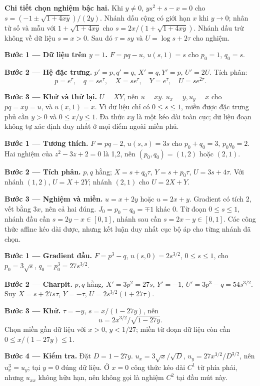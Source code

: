 \textbf{Chi tiết chọn nghiệm bậc hai.} Khi $y\ne0$, $ys^2+s-x=0$ cho $s=(-1\pm\sqrt{1+4xy})/(2y)$. Nhánh dấu cộng có giới hạn $x$ khi $y\to0$; nhân tử số và mẫu với $1+\sqrt{1+4xy}$ cho $s=2x/(1+\sqrt{1+4xy})$. Nhánh dấu trừ không về dữ liệu $s=x>0$. Sau đó $\tau=sy$ và $U=\log s+2\tau$ cho nghiệm.

\textbf{Bước 1 — Dữ liệu trên $y=1$.} $F=pq-u$, $u(s,1)=s$ cho $p_0=1$, $q_0=s$.

\textbf{Bước 2 — Hệ đặc trưng.} $p'=p,q'=q$, $X'=q,Y'=p$, $U'=2U$. Tích phân:
\[p=e^\tau,\quad q=se^\tau,\quad X=se^\tau,\quad Y=e^\tau,\quad U=se^{2\tau}.\]

\textbf{Bước 3 — Khử và thử lại.} $U=XY$, nên $u=xy$. $u_x=y,u_y=x$ cho $pq=xy=u$, và $u(x,1)=x$. Vì dữ liệu chỉ có $0\le s\le1$, miền được đặc trưng phủ cần $y>0$ và $0\le x/y\le1$. Đa thức $xy$ là một kéo dài toàn cục; dữ liệu đoạn không tự xác định duy nhất ở mọi điểm ngoài miền phủ.

\textbf{Bước 1 — Tương thích.} $F=pq-2$, $u(s,s)=3s$ cho $p_0+q_0=3$, $p_0q_0=2$. Hai nghiệm của $z^2-3z+2=0$ là 1,2, nên $(p_0,q_0)=(1,2)$ hoặc $(2,1)$.

\textbf{Bước 2 — Tích phân.} $p,q$ hằng; $X=s+q_0\tau$, $Y=s+p_0\tau$, $U=3s+4\tau$. Với nhánh $(1,2)$, $U=X+2Y$; nhánh $(2,1)$ cho $U=2X+Y$.

\textbf{Bước 3 — Nghiệm và miền.} $u=x+2y$ hoặc $u=2x+y$. Gradient có tích 2, vết bằng $3x$, nên cả hai đúng. $J_0=p_0-q_0=\mp1$ khác 0. Từ đoạn $0\le s\le1$, nhánh đầu cần $s=2y-x\in[0,1]$, nhánh sau cần $s=2x-y\in[0,1]$. Các công thức affine kéo dài được, nhưng kết luận duy nhất cục bộ áp cho từng nhánh đã chọn.

\textbf{Bước 1 — Gradient đầu.} $F=p^3-q$, $u(s,0)=2s^{3/2}$, $0\le s\le1$, cho $p_0=3\sqrt s$, $q_0=p_0^3=27s^{3/2}$.

\textbf{Bước 2 — Charpit.} $p,q$ hằng, $X'=3p^2=27s$, $Y'=-1$, $U'=3p^3-q=54s^{3/2}$. Suy $X=s+27s\tau$, $Y=-\tau$, $U=2s^{3/2}(1+27\tau)$.

\textbf{Bước 3 — Khử.} $\tau=-y$, $s=x/(1-27y)$, nên
\[u=2x^{3/2}/\sqrt{1-27y}.\]
Chọn miền gần dữ liệu với $x>0$, $y<1/27$; miền từ đoạn dữ liệu còn cần $0\le x/(1-27y)\le1$.

\textbf{Bước 4 — Kiểm tra.} Đặt $D=1-27y$. $u_x=3\sqrt{x}/\sqrt D$, $u_y=27x^{3/2}/D^{3/2}$, nên $u_x^3=u_y$; tại $y=0$ đúng dữ liệu. Ở $x=0$ công thức kéo dài $C^1$ từ phía phải, nhưng $u_{xx}$ không hữu hạn, nên không gọi là nghiệm $C^2$ tại đầu mút này.

